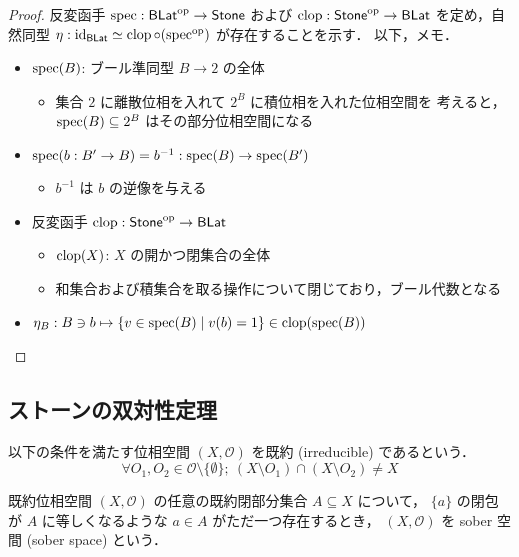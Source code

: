 \documentclass[titlepage]{ltjsreport}
\newcommand{\id}[1]{\mathrm{id}_{#1}}
\newcommand{\blat}{\mathsf{BLat}}
\newcommand{\stone}{\mathsf{Stone}}
\begin{document}
\begin{proof}
  反変函手 $\spec:\blat^\mathrm{op}\to\stone$ および
  $\clop:\stone^\mathrm{op}\to\blat$ を定め，自然同型
  $\eta:\id{\blat}\simeq\clop\circ(\spec^\mathrm{op})$ が存在することを示す．
  以下，メモ．
  \begin{itemize}
    \item $\operatorname{spec}(B)$: ブール準同型 $B\to2$ の全体
          \begin{itemize}
            \item 集合 $2$ に離散位相を入れて $2^B$ に積位相を入れた位相空間を
                  考えると，$\operatorname{spec}(B)\subseteq 2^B$ はその部分位相空間になる
          \end{itemize}
    \item $\operatorname{spec}(b:B'\to B)=b^{-1}:\operatorname{spec}(B)\to\operatorname{spec}(B')$
          \begin{itemize}
            \item $b^{-1}$ は $b$ の逆像を与える
          \end{itemize}
    \item 反変函手 $\clop:\stone^\mathrm{op}\to\blat$
          \begin{itemize}
            \item $\operatorname{clop}(X)$: $X$ の開かつ閉集合の全体
            \item 和集合および積集合を取る操作について閉じており，ブール代数となる
          \end{itemize}
    \item $\eta_B:B\ni b\mapsto\{v\in\operatorname{spec}(B)\mid v(b)=1\}\in\operatorname{clop}(\operatorname{spec}(B))$
  \end{itemize}
\end{proof}

\subsection{ストーンの双対性定理}

\begin{definition}[既約]
  以下の条件を満たす位相空間
  $(X,\mathcal{O})$
  を既約
  (irreducible)
  であるという．
  \begin{equation}
    \forall O_1,O_2\in\mathcal{O}\setminus\{\emptyset\};
    \ (X\setminus O_1)\cap(X\setminus O_2)\neq X
  \end{equation}
\end{definition}

\begin{definition}[sober 空間]
  既約位相空間
  $(X,\mathcal{O})$
  の任意の既約閉部分集合
  $A\subseteq X$
  について，
  $\{a\}$
  の閉包が
  $A$
  に等しくなるような
  $a\in A$
  がただ一つ存在するとき，
  $(X,\mathcal{O})$
  を sober 空間 (sober space) という．
\end{definition}
\end{document}

